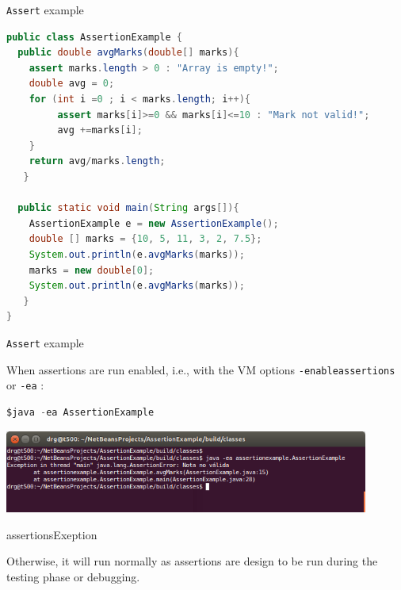 \documentclass[11pt, xcolor=svgnames]{beamer}
\begin{document}

\begin{frame}[fragile]{\texttt{Assert} example}

\begin{lstlisting}[language=JAVA,basicstyle=\scriptsize]
public class AssertionExample {
  public double avgMarks(double[] marks){
   	assert marks.length > 0 : "Array is empty!";
   	double avg = 0;
   	for (int i =0 ; i < marks.length; i++){
   	     assert marks[i]>=0 && marks[i]<=10 : "Mark not valid!";
   	     avg +=marks[i];
   	}
   	return avg/marks.length;
   }

  public static void main(String args[]){
   	AssertionExample e = new AssertionExample();
   	double [] marks = {10, 5, 11, 3, 2, 7.5};
   	System.out.println(e.avgMarks(marks));
   	marks = new double[0];
   	System.out.println(e.avgMarks(marks));
   }
}

\end{lstlisting}


\end{frame}




\begin{frame}[fragile]{\texttt{Assert} example}

When assertions are run enabled, i.e., with the VM options \texttt{-enableassertions} or \texttt{-ea} :
\begin{lstlisting}[language=JAVA,basicstyle=\scriptsize]
$java -ea AssertionExample
\end{lstlisting}

\begin{center}
 \includegraphics[width=340pt]{./figs/assertionsExeption}
\end{center}

assertionsExeption 

Otherwise, it will run normally as assertions are design to be run during the testing phase or debugging.

\end{frame}
\end{document}
